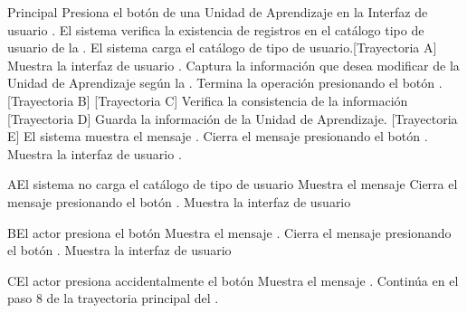 \begin{UCtrayectoria}{Principal}
    \UCpaso[\UCactor] Presiona el botón  de una Unidad de Aprendizaje en la Interfaz de usuario  .
    \UCpaso El sistema verifica la existencia de registros en el catálogo tipo de usuario de la  .
   \UCpaso El sistema carga el catálogo de tipo de usuario.[Trayectoria A]
    \UCpaso Muestra la interfaz de usuario .
 	\UCpaso[\UCactor] Captura la información que desea modificar de la Unidad de Aprendizaje según la .
 	\UCpaso[\UCactor] Termina la operación presionando el botón . [Trayectoria B] [Trayectoria C]
 	\UCpaso Verifica la consistencia de la información [Trayectoria D]
 	\UCpaso Guarda la información de la Unidad de Aprendizaje. [Trayectoria E]
 	\UCpaso El sistema muestra el mensaje .
 	\UCpaso[\UCactor] Cierra el mensaje presionando el botón .
 	\UCpaso Muestra la interfaz de usuario .

\end{UCtrayectoria}
\begin{UCtrayectoriaA}{A}{El sistema no carga el catálogo de tipo de usuario}
	\UCpaso Muestra el mensaje 
	\UCpaso[\UCactor] Cierra el mensaje presionando el botón .
	 \UCpaso Muestra la interfaz de usuario 
\end{UCtrayectoriaA}
\begin{UCtrayectoriaA}{B}{El actor presiona el botón }
	\UCpaso Muestra el mensaje .
	\UCpaso[\UCactor] Cierra el mensaje presionando el botón .
	\UCpaso Muestra la interfaz de usuario 
\end{UCtrayectoriaA}
\begin{UCtrayectoriaA}{C}{El actor presiona accidentalmente el botón }
	\UCpaso Muestra el mensaje .
    \UCpaso Continúa en el paso 8 de la trayectoria principal del .
\end{UCtrayectoriaA}
